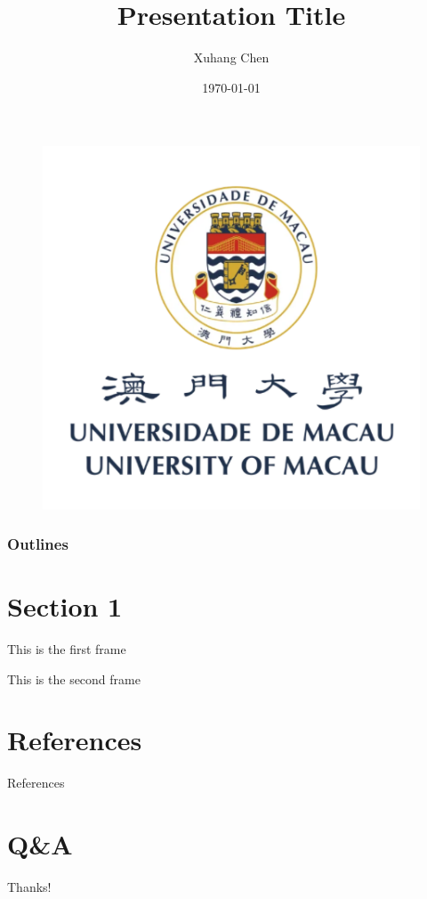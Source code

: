 \documentclass{beamer}
\author{Xuhang Chen}
\title{Presentation Title}
\institute{FST, Univeristy of Macau}
\date{\today}
\begin{document}
\begin{frame}
    \titlepage
    \begin{figure}[htpb]
        \begin{center}
            \includegraphics[width=0.2\linewidth]{pic/um_red.png}
        \end{center}
    \end{figure}
\end{frame}

\begin{frame}
    \frametitle{Outlines}
    \tableofcontents[sectionstyle=show,subsectionstyle=show/shaded/hide,subsubsectionstyle=show/shaded/hide]
\end{frame}


\section{Section 1}

\begin{frame}
    This is the first frame
\end{frame}

\begin{frame}
    This is the second frame
\end{frame}

\section*{References}

\begin{frame}[allowframebreaks]{References}
    
    
\end{frame}

\section*{Q\&A}

\begin{frame}
    \begin{center}
        {\Huge\calligra Thanks!}
    \end{center}
\end{frame}
\end{document}
